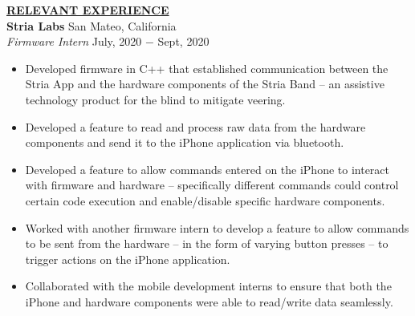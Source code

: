 \documentclass{article}
\begin{document}
% 
%
\noindent \textbf{\underline{RELEVANT EXPERIENCE}} \\
\noindent \textbf{Stria Labs} \hfill San Mateo, California \\
\textit{Firmware Intern} \hfill July, 2020 $-$ Sept, 2020
\begin{itemize}[noitemsep,nolistsep,leftmargin=*]
\item {Developed firmware in C++ that established communication between the Stria App and the hardware components of the Stria Band -- an assistive technology product for the blind to mitigate veering.}
\item {Developed a feature to read and process raw data from the hardware components and send it to the iPhone application via bluetooth.}
\item {Developed a feature to allow commands entered on the iPhone to interact with firmware and hardware -- specifically different commands could control certain code execution and enable/disable specific hardware components.}
\item {Worked with another firmware intern to develop a feature to allow commands to be sent from the hardware -- in the form of varying button presses -- to trigger actions on the iPhone application.}
\item {Collaborated with the mobile development interns to ensure that both the iPhone and hardware components were able to read/write data seamlessly.\\}
\end{itemize}
\end{document}
